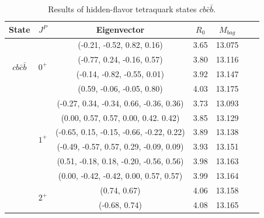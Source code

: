 \documentclass[prd,twocolumn,floatfix,nofootinbib]{revtex4}
\begin{document}
\renewcommand{\tabcolsep}{0.84cm}
\renewcommand{\arraystretch}{1.2}
\begin{table}[!htbp]
    \caption{Results of hidden-flavor tetraquark states $cb\bar{c}\bar{b}$.}
    \label{tab:hiddenflavor-cbcb}
    \begin{tabular}{ccccccc}
        \hline\hline
        {\rm State}     &$J^{P}$    &{\rm Eigenvector}                          &$R_{0}$    &$M_{bag}$ \\ \hline
        \multirow{4}{*}{$cb\bar{c}\bar{b}$}
                        &\multirow{4}{*}{$0^{+}$}
                                    &(-0.21, -0.52, 0.82, 0.16)                 &3.65	    &13.075 \\ 
                        &           &(-0.77, 0.24, -0.16, 0.57)                 &3.80	    &13.116 \\ 
                        &           &(-0.14, -0.82, -0.55, 0.01)                &3.92	    &13.147 \\ 
                        &           &(0.59, -0.06, -0.05, 0.80)                 &4.03	    &13.175 \\ 
                        &\multirow{6}{*}{$1^{+}$}
                                    &(-0.27, 0.34, -0.34, 0.66, -0.36, 0.36)    &3.73	    &13.093 \\ 
                        &           &(0.00, 0.57, 0.57, 0.00, 0.42. 0.42)       &3.85	    &13.129 \\ 
                        &           &(-0.65, 0.15, -0.15, -0.66, -0.22, 0.22)   &3.89	    &13.138 \\ 
                        &           &(-0.49, -0.57, 0.57, 0.29, -0.09, 0.09)    &3.93	    &13.151 \\ 
                        &           &(0.51, -0.18, 0.18, -0.20, -0.56, 0.56)    &3.98	    &13.163 \\ 
                        &           &(0.00, -0.42, -0.42, 0.00, 0.57, 0.57)     &3.99	    &13.164 \\ 
                        &\multirow{2}{*}{$2^{+}$}
                                    &(0.74, 0.67)                               &4.06	    &13.158 \\ 
                        &           &(-0.68, 0.74)                              &4.08	    &13.165 \\ 
        \hline\hline
    \end{tabular}
\end{table}
\end{document}

